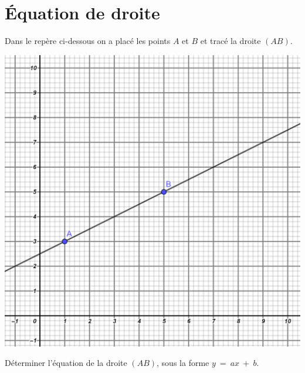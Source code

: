 %		
%	
%		
%		
%	
	
\section{\'Equation de droite}

Dans le repère ci-dessous on a placé les points $A$ et $B$ et tracé la droite $(AB)$.


\begin{center}
	\includegraphics[scale=0.2]{img/droite2_2}
\end{center}

\begin{questions}

	
	\question[5] Déterminer l'équation de la droite $(AB)$, sous la forme $y\:=\:ax\:+\:b $.
	\fillwithdottedlines{9cm}
\end{questions}

